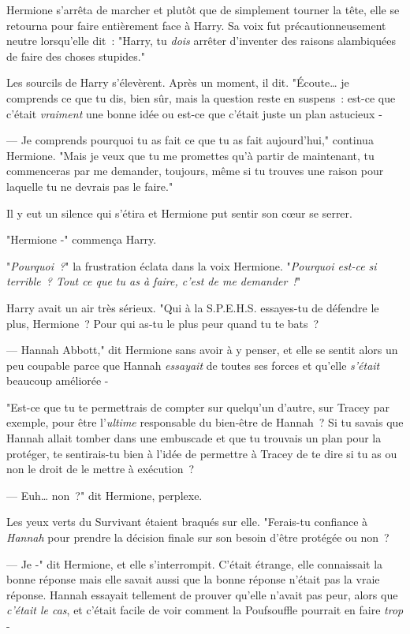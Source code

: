 Hermione s'arrêta de marcher et plutôt que de simplement tourner la tête, elle se retourna pour faire entièrement face à Harry. Sa voix fut précautionneusement neutre lorsqu'elle dit~: "Harry, tu \emph{dois} arrêter d'inventer des raisons alambiquées de faire des choses stupides."

Les sourcils de Harry s'élevèrent. Après un moment, il dit. "Écoute… je comprends ce que tu dis, bien sûr, mais la question reste en suspens~: est-ce que c'était \emph{vraiment} une bonne idée ou est-ce que c'était juste un plan astucieux -

--- Je comprends pourquoi tu as fait ce que tu as fait aujourd'hui," continua Hermione. "Mais je veux que tu me promettes qu'à partir de maintenant, tu commenceras par me demander, toujours, même si tu trouves une raison pour laquelle tu ne devrais pas le faire."

Il y eut un silence qui s'étira et Hermione put sentir son cœur se serrer.

"Hermione -" commença Harry.

"\emph{Pourquoi~?}" la frustration éclata dans la voix Hermione. "\emph{Pourquoi est-ce si terrible~? Tout ce que tu as à faire, c'est de me demander~!}"

Harry avait un air très sérieux. "Qui à la S.P.E.H.S. essayes-tu de défendre le plus, Hermione~? Pour qui as-tu le plus peur quand tu te bats~?

--- Hannah Abbott," dit Hermione sans avoir à y penser, et elle se sentit alors un peu coupable parce que Hannah \emph{essayait} de toutes ses forces et qu'elle \emph{s'était} beaucoup améliorée -

"Est-ce que tu te permettrais de compter sur quelqu'un d'autre, sur Tracey par exemple, pour être l'\emph{ultime} responsable du bien-être de Hannah~? Si tu savais que Hannah allait tomber dans une embuscade et que tu trouvais un plan pour la protéger, te sentirais-tu bien à l'idée de permettre à Tracey de te dire si tu as ou non le droit de le mettre à exécution~?

--- Euh… non~?" dit Hermione, perplexe.

Les yeux verts du Survivant étaient braqués sur elle. "Ferais-tu confiance à \emph{Hannah} pour prendre la décision finale sur son besoin d'être protégée ou non~?

--- Je -" dit Hermione, et elle s'interrompit. C'était étrange, elle connaissait la bonne réponse mais elle savait aussi que la bonne réponse n'était pas la vraie réponse. Hannah essayait tellement de prouver qu'elle n'avait pas peur, alors que \emph{c'était le cas}, et c'était facile de voir comment la Poufsouffle pourrait en faire \emph{trop} -


